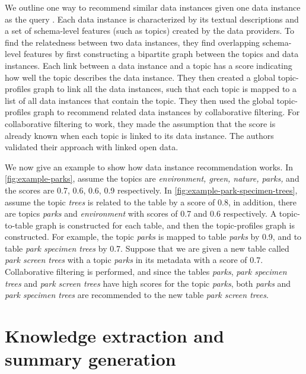 We outline one way to recommend similar data instances given one data instance as the query \cite{conf/esws/EllefiBDT16}. Each data instance is characterized by its textual descriptions and a set of schema-level features (such as topics) created by the data providers. To find the relatedness between two data instances, they find overlapping schema-level features by first constructing a bipartite graph between the topics and data instances. Each link between a data instance and a topic has a score indicating how well the topic describes the data instance. They then created a global topic-profiles graph to link all the data instances, such that each topic is mapped to a list of all data instances that contain the topic. They then used the global topic-profiles graph to recommend related data instances by collaborative filtering. For collaborative filtering to work, they made the assumption that the score is already known when each topic is linked to its data instance. The authors validated their approach with linked open data.

We now give an example to show how data instance recommendation works. In \autoref{fig:example-parks}, assume the topics are \textit{environment, green, nature, parks,} and the scores are 0.7, 0.6, 0.6, 0.9 respectively. In \autoref{fig:example-park-specimen-trees}, assume the topic \textit{trees} is related to the table by a score of 0.8, in addition, there are topics \textit{parks} and \textit{environment} with scores of 0.7 and 0.6 respectively. A topic-to-table graph is constructed for each table, and then the topic-profiles graph is constructed. For example, the topic \textit{parks} is mapped to table \textit{parks} by 0.9, and to table \textit{park specimen trees} by 0.7. Suppose that we are given a new table called \textit{park screen trees} with a topic \textit{parks} in its metadata with a score of 0.7. Collaborative filtering is performed, and since the tables \textit{parks}, \textit{park specimen trees} and \textit{park screen trees} have high scores for the topic \textit{parks}, both \textit{parks} and \textit{park specimen trees} are recommended to the new table \textit{park screen trees}.

\section{Knowledge extraction and summary generation}
\label{sec:KnowledgeExtractionAndSummaryGeneration}

